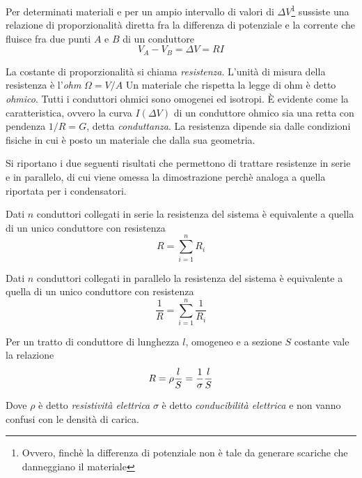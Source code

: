 \begin{obses}
    Per determinati materiali e per un ampio intervallo di valori di $\Delta V$\footnote{Ovvero,
    finchè la differenza di potenziale non è tale da generare scariche che danneggiano il materiale}
    sussiste una relazione di proporzionalità diretta fra la differenza di potenziale e la corrente
    che fluisce fra due punti $A$ e $B$ di un conduttore
    \begin{equation}
        V_A-V_B=\Delta V=RI
    \end{equation}
\end{obses}
La costante di proporzionalità si chiama \textit{resistenza}. L'unità di misura della resistenza è l'\textit{ohm} $\Omega=V/A$
Un materiale che rispetta la legge di ohm è detto \textit{ohmico}. Tutti i conduttori ohmici sono omogenei ed isotropi.
È evidente come la caratteristica, ovvero la curva $I(\Delta V)$ di un conduttore ohmico sia una retta con pendenza $1/R=G$, detta \textit{conduttanza}.
La resistenza dipende sia dalle condizioni fisiche in cui è posto un materiale che dalla sua geometria.

Si riportano i due seguenti risultati che permettono di trattare resistenze in serie e in parallelo,
di cui viene omessa la dimostrazione perchè analoga a quella riportata per i condensatori.
\begin{thm}
    Dati $n$ conduttori collegati in serie la resistenza del sistema è equivalente a quella di un unico conduttore con resistenza
    \[
        R=\sum_{i=1}^n R_i
    \]
\end{thm}
\begin{thm}
    Dati $n$ conduttori collegati in parallelo la resistenza del sistema è equivalente a quella di un unico conduttore con resistenza
    \[
        \frac{1}{R}=\sum_{i=1}^n\frac{1}{R_i}
    \]
\end{thm}


\begin{obses}
    Per un tratto di conduttore di lunghezza $l$, omogeneo e a sezione $S$ costante vale la relazione
    \begin{equation}
        R=\rho\frac{l}{S}=\frac{1}{\sigma}\frac{l}{S}
    \end{equation}
\end{obses}
Dove $\rho$ è detto \textit{resistività elettrica} $\sigma$ è detto \textit{conducibilità elettrica} e non vanno confusi
con le densità di carica.

